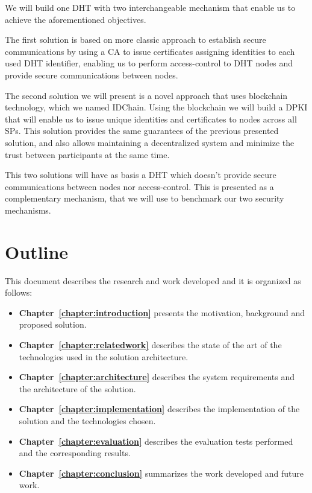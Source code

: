 We will build one DHT with two interchangeable mechanism that enable us to achieve the aforementioned objectives.

The first solution is based on more classic approach to establish secure communications by using a \acl{CA} to issue certificates assigning identities to each used DHT identifier, enabling us to perform access-control to \ac{DHT} nodes and provide secure communications between nodes.

The second solution we will present is a novel approach that uses blockchain technology, which we named IDChain.
Using the blockchain we will build a \ac{DPKI} that will enable us to issue unique identities and certificates to nodes across all \acp{SP}.
This solution provides the same guarantees of the previous presented solution, and also allows maintaining a decentralized system and minimize the trust between participants at the same time.

This two solutions will have as basis a \ac{DHT} which doesn't provide secure communications between nodes nor access-control.
This is presented as a complementary mechanism, that we will use to benchmark our two security mechanisms.

\section{Outline}
This document describes the research and work developed and it is organized as follows:

\begin{itemize}
  \item \textbf{Chapter~\ref{chapter:introduction}} presents the motivation, background and proposed solution.
  \item \textbf{Chapter~\ref{chapter:relatedwork}} describes the state of the art of the technologies used in the solution architecture.
  \item \textbf{Chapter~\ref{chapter:architecture}} describes the system requirements and the architecture of the solution.
  \item \textbf{Chapter~\ref{chapter:implementation}} describes the implementation of the solution and the technologies chosen.
  \item \textbf{Chapter~\ref{chapter:evaluation}} describes the evaluation tests performed and the corresponding results.
  \item \textbf{Chapter~\ref{chapter:conclusion}} summarizes the work developed and future work.
\end{itemize}

\cleardoublepage

